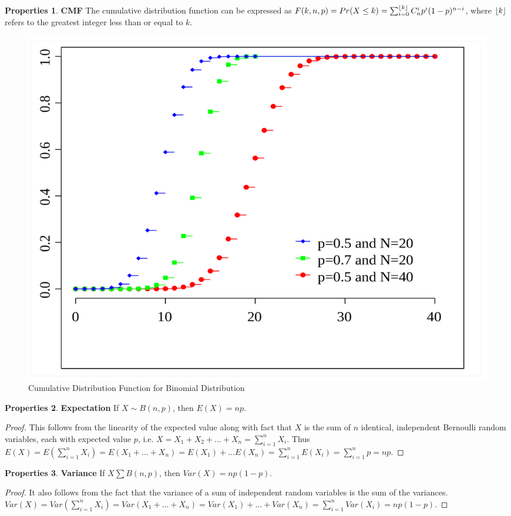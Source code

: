 \documentclass{article}
\theoremstyle{definition}
\newtheorem{prop}{Properties}[section]
\DeclarePairedDelimiter\floor{\lfloor}{\rfloor}
\begin{document}
\begin{prop}
\textbf{CMF} The cumulative distribution function can be expressed as $F(k,n,p)=Pr(X\leq k)=\sum_{i=0}^{\floor*{k}}C_{n}^{i}p^i(1-p)^{n-i}$, where $\floor*{k}$ refers to the greatest integer less than or equal to $k$.
\begin{figure}[h]
\caption{Cumulative Distribution Function for Binomial Distribution}
\centering
\includegraphics[width=\textwidth]{Statistics/images/Binomial_distribution_cdf.pdf}
\end{figure}

\end{prop}
\begin{prop}
\textbf{Expectation} If $X\sim B(n,p)$, then $E(X)=np$.
\begin{proof}
This follows from the linearity of the expected value along with fact that $X$ is the sum of $n$ identical, independent Bernoulli random variables, each with expected value $p$, i.e. $X=X_1+X_2+...+X_n=\sum_{i=1}^{n}X_i$. Thus $E(X)=E(\sum_{i=1}^{n}X_i)=E(X_1+...+X_n)=E(X_1)+...E(X_n)=\sum_{i=1}^{n}E(X_i)=\sum_{i=1}^{n}p=np$.
\end{proof}
\end{prop}

\begin{prop}
\textbf{Variance} If $X\sum B(n,p)$, then $Var(X)=np(1-p)$.
\begin{proof}
It also follows from the fact that the variance of a sum of independent random variables is the sum of the variances.
$Var(X)=Var(\sum_{i=1}^{n}X_i)=Var(X_1+...+X_n)=Var(X_1)+...+Var(X_n)=\sum_{i=1}^{n}Var(X_i)=np(1-p)$.
\end{proof}
\end{prop}
\end{document}
